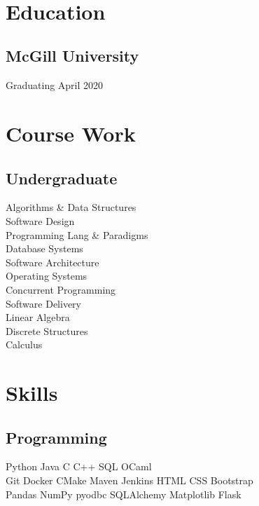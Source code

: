 \documentclass[]{willguthrie-resume}
\begin{document}
 
\header

\noindent\makebox[\linewidth]{\rule{0.94\paperwidth}{0.4pt}}

\hspace*{-\parindent}%
\begin{minipage}[t][][b]{0.33\textwidth}~

	\section{Education}
	\subsection{McGill University}
	Graduating April 2020
	\sectionsep

	\section{Course Work}
	\subsection{Undergraduate}
	Algorithms \& Data Structures \\
	Software Design \\
	Programming Lang \& Paradigms \\
	Database Systems \\
	Software Architecture \\
	Operating Systems \\
	Concurrent Programming \\
	Software Delivery \\
	Linear Algebra \\
	Discrete Structures \\
	Calculus \\
	\sectionsep

	\section{Skills}
	\subsection{Programming}
	Python \tb Java \tb C \tb C++ \tb SQL \tb OCaml \\
	Git \tb Docker \tb CMake \tb Maven \tb Jenkins \tb HTML \tb CSS \tb Bootstrap \\
	Pandas \tb NumPy \tb pyodbc \tb SQLAlchemy \tb Matplotlib \tb Flask \\
	\sectionsep


\end{minipage}
\end{document}
